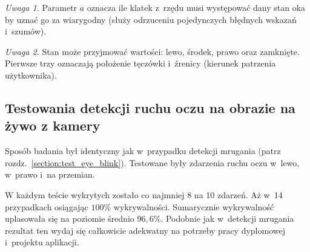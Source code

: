 \vspace{3mm}

\textit{Uwaga 1.} Parametr $a$ oznacza ile klatek z~rzędu musi występować dany stan oka by uznać go za wiarygodny (służy odrzuceniu pojedynczych błędnych wskazań i~szumów).

\par

\textit{Uwaga 2.} Stan może przyjmować wartości: lewo, środek, prawo oraz zamknięte. Pierwsze trzy oznaczają położenie tęczówki i~źrenicy (kierunek patrzenia użytkownika). 




\subsection{Testowania detekcji ruchu oczu na obrazie na żywo z kamery}

Sposób badania był identyczny jak w~przypadku detekcji mrugania (patrz rozdz.~\ref{section:test_eye_blink}). Testowane były zdarzenia ruchu oczu w~lewo, w~prawo i~na przemian.



W każdym teście wykrytych zostało co najmniej 8 na 10 zdarzeń. Aż w~14 przypadkach osiągając $100\%$ wykrywalności. Sumarycznie wykrywalność uplasowała się na poziomie średnio $96,6\%$. Podobnie jak w~detekcji mrugania rezultat ten wydaj się całkowicie adekwatny na potrzeby pracy dyplomowej i~projektu aplikacji. 